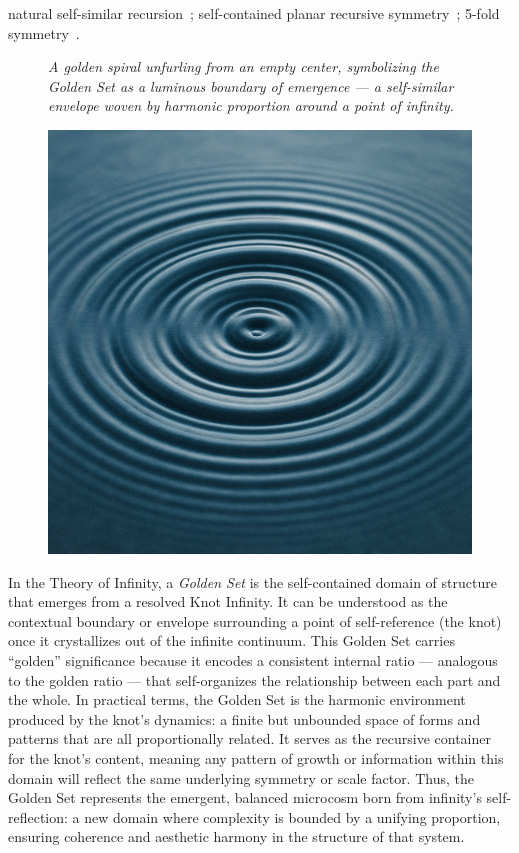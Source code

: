 \documentclass[11pt]{article}
\begin{document}
natural self-similar recursion~\cite{Thompson1917}; self-contained planar recursive symmetry~\cite{Penrose1978}; 5-fold symmetry~\cite{Shechtman1984}.

\begin{figure}[ht]
    \centering
    \begin{minipage}[c]{0.65\textwidth}
        \small
        \textit{A golden spiral unfurling from an empty center, symbolizing the Golden Set as a luminous boundary of emergence --- a self-similar envelope woven by harmonic proportion around a point of infinity.}
    \end{minipage}    
    \hfill
    \begin{minipage}[c]{0.25\textwidth}
        \includegraphics[width=\linewidth]{assets/rings.png} 
    \end{minipage}
\end{figure}




In the Theory of Infinity, a \emph{Golden Set} is the self-contained domain of structure that emerges from a resolved Knot Infinity. It can be understood as the contextual boundary or envelope surrounding a point of self-reference (the knot) once it crystallizes out of the infinite continuum. This Golden Set carries “golden” significance because it encodes a consistent internal ratio --- analogous to the golden ratio --- that self-organizes the relationship between each part and the whole. In practical terms, the Golden Set is the harmonic environment produced by the knot's dynamics: a finite but unbounded space of forms and patterns that are all proportionally related. It serves as the recursive container for the knot's content, meaning any pattern of growth or information within this domain will reflect the same underlying symmetry or scale factor. Thus, the Golden Set represents the emergent, balanced microcosm born from infinity's self-reflection: a new domain where complexity is bounded by a unifying proportion, ensuring coherence and aesthetic harmony in the structure of that system.
\end{document}

